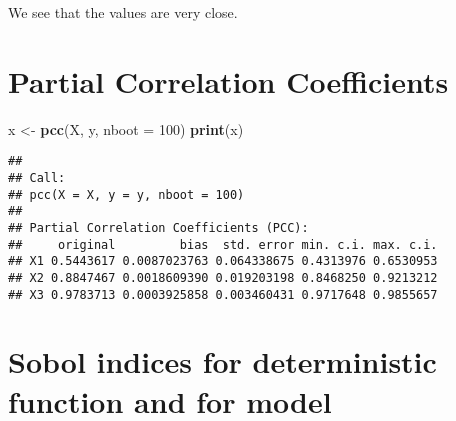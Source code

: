 \documentclass[
  11pt,
]{book}
\newenvironment{Shaded}{\begin{snugshade}}{\end{snugshade}}
\newcommand{\DataTypeTok}[1]{\textcolor[rgb]{0.13,0.29,0.53}{#1}}
\newcommand{\DecValTok}[1]{\textcolor[rgb]{0.00,0.00,0.81}{#1}}
\newcommand{\KeywordTok}[1]{\textcolor[rgb]{0.13,0.29,0.53}{\textbf{#1}}}
\newcommand{\NormalTok}[1]{#1}
\newcommand{\StringTok}[1]{\textcolor[rgb]{0.31,0.60,0.02}{#1}}
\begin{document}
We see that the values are very close.

\hypertarget{partial-correlation-coefficients}{%
\section{Partial Correlation Coefficients}\label{partial-correlation-coefficients}}

\begin{Shaded}
\begin{Highlighting}[]
\NormalTok{x <-}\StringTok{ }\KeywordTok{pcc}\NormalTok{(X, y, }\DataTypeTok{nboot =} \DecValTok{100}\NormalTok{)}
\KeywordTok{print}\NormalTok{(x)}
\end{Highlighting}
\end{Shaded}

\begin{verbatim}
## 
## Call:
## pcc(X = X, y = y, nboot = 100)
## 
## Partial Correlation Coefficients (PCC):
##     original         bias  std. error min. c.i. max. c.i.
## X1 0.5443617 0.0087023763 0.064338675 0.4313976 0.6530953
## X2 0.8847467 0.0018609390 0.019203198 0.8468250 0.9213212
## X3 0.9783713 0.0003925858 0.003460431 0.9717648 0.9855657
\end{verbatim}

\hypertarget{sobol-indices-for-deterministic-function-and-for-model}{%
\section{Sobol indices for deterministic function and for model}\label{sobol-indices-for-deterministic-function-and-for-model}}
\end{document}
